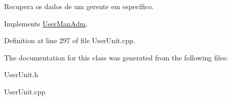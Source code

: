 Recupera os dados de um gerente em específico. 



Implements \hyperlink{classUserManAdm_a62e826d1c11061df021016e94e88f9ba}{User\-Man\-Adm}.



Definition at line 297 of file User\-Unit.\-cpp.



The documentation for this class was generated from the following files\-:\begin{DoxyCompactItemize}
\item 
User\-Unit.\-h\item 
User\-Unit.\-cpp\end{DoxyCompactItemize}
